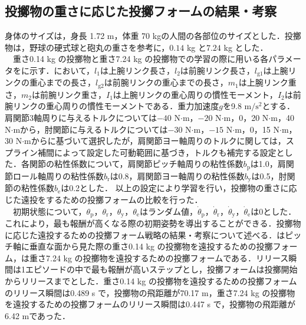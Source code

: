 \subsection{投擲物の重さに応じた投擲フォームの結果・考察}
身体のサイズは，身長 1.72 m，体重 70 kgの人間の各部位のサイズとした．投擲物は，野球の硬式球と砲丸の重さを参考に，$0.14$ kg\cite{horiuchi} と$7.24$ kg\cite{haq} とした．\\
　重さ0.14 kg の投擲物と重さ7.24 kg の投擲物での学習の際に用いる各パラメータをに示す\cite{irving}．において，$l_{1}$は上腕リンク長さ，$l_{2}$は前腕リンク長さ，$l_{\mathrm{g1}}$は上腕リンクの重心までの長さ，$l_{\mathrm{g2}}$は前腕リンクの重心までの長さ，$m_{1}$は上腕リンク重さ，$m_{2}$は前腕リンク重さ，$I_{1}$は上腕リンクの重心周りの慣性モーメント，$I_{2}$は前腕リンクの重心周りの慣性モーメントである．重力加速度$g$を9.8 $\mathrm{m/s^{2}}$とする．肩関節3軸周りに与えるトルクについては$-40$ N$\cdot$m，$-20$ N$\cdot$m，0，20 N$\cdot$m，40 N$\cdot$mから，肘関節に与えるトルクについては$-30$ N$\cdot$m，$-15$ N$\cdot$m，0，15 N$\cdot$m，30 N$\cdot$mからに基づいて選択したが，肩関節ヨー軸周りのトルクに関しては，スプライン補間によって設定した可動範囲に基づき，トルクも補完する設定とした．各関節の粘性係数について，肩関節ピッチ軸周りの粘性係数$b_{\mathrm{p}}$は1.0，肩関節ロール軸周りの粘性係数$b_{\mathrm{r}}$は0.8，肩関節ヨー軸周りの粘性係数$b_{\mathrm{y}}$は0.5，肘関節の粘性係数$b_{\mathrm{e}}$は0.2とした．
以上の設定により学習を行い，投擲物の重さに応じた遠投をするための投擲フォームの比較を行った．\\
　初期状態について，$\theta_{\mathrm{p}}$，$\theta_{\mathrm{r}}$，$\theta_{\mathrm{y}}$，$\theta_{\mathrm{e}}$はランダム値，$\dot{\theta}_{\mathrm{p}}$，$\dot{\theta}_{\mathrm{r}}$，$\dot{\theta}_{\mathrm{y}}$，$\dot{\theta}_{\mathrm{e}}$は0とした．これにより，最も報酬が高くなる際の初期姿勢を導出することができる．投擲物に応じた遠投するための投擲フォーム戦略の結果・考察について述べる．はピッチ軸に垂直な面から見た際の重さ0.14 kg の投擲物を遠投するための投擲フォーム，は重さ7.24 kg の投擲物を遠投するための投擲フォームである．リリース瞬間は1エピソードの中で最も報酬が高いステップとし，投擲フォームは投擲開始からリリースまでとした．重さ0.14 kg の投擲物を遠投するための投擲フォームのリリース瞬間は0.489 s で，投擲物の飛距離が70.17 m，重さ7.24 kg の投擲物を遠投するための投擲フォームのリリース瞬間は0.447 s で，投擲物の飛距離が6.42 mであった．\\
